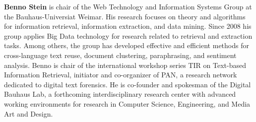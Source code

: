 {\bfseries Benno Stein} is chair of the Web Technology and Information Systems Group at the Bauhaus-Universiat Weimar. His research focuses on theory and algorithms for information retrieval, information extraction, and data mining. Since 2008 his group applies Big Data technology for research related to retrieval and extraction tasks. Among others, the group has developed effective and efficient methods for cross-language text reuse, document clustering, paraphrasing, and sentiment analysis. Benno is chair of the international workshop series TIR on Text-based Information Retrieval, initiator and co-organizer of PAN, a research network dedicated to digital text forensics. He is co-founder and spokesman of the Digital Bauhaus Lab, a forthcoming interdisciplinary research center with advanced working environments for research in Computer Science, Engineering, and Media Art and Design.  
